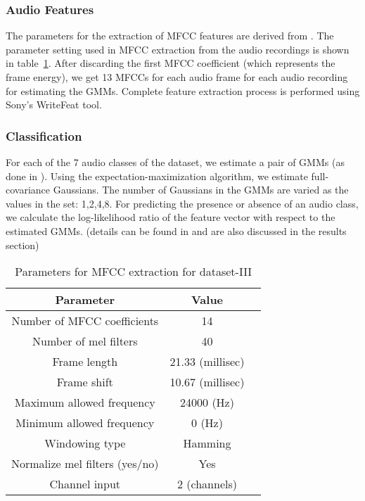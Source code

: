 \subsubsection{Audio Features}
The parameters for the extraction of MFCC features are derived from \cite{foster2015chime}. The parameter setting used in MFCC extraction from the audio recordings is shown in table~\ref{tab:param_mfcc_db3}. After discarding the first MFCC coefficient (which represents the frame energy), we get 13 MFCCs for each audio frame for each audio recording for estimating the GMMs. Complete feature extraction process is performed using Sony's WriteFeat tool.

\subsubsection{Classification}
For each of the 7 audio classes of the dataset, we estimate a pair of GMMs (as done in \cite{foster2015chime}). Using the expectation-maximization algorithm, we estimate full-covariance Gaussians. The number of Gaussians in the GMMs are varied as the values in the set: {1,2,4,8}. For predicting the presence or absence of an audio class, we calculate the log-likelihood ratio of the feature vector with respect to the estimated GMMs. (details can be found in \cite{foster2015chime} and are also discussed in the results section)

\begin{table}[tb]
\caption[Parameters for MFCC extraction for dataset-III]{Parameters for MFCC extraction for dataset-III}
\label{tab:param_mfcc_db3}
\centering
\begin{tabular}{ccc}
\toprule
Parameter & Value \\
\midrule
Number of MFCC coefficients	& 14\\
Number of mel filters	& 40\\
Frame length & 21.33 (millisec)\\
Frame shift 	& 10.67 (millisec)\\
Maximum allowed frequency & 24000 (Hz)\\
Minimum allowed frequency & 0 (Hz)\\
Windowing type & Hamming\\
Normalize mel filters (yes/no) & Yes \\
Channel input & 2 (channels) \\
\bottomrule 
\end{tabular}
\end{table}

